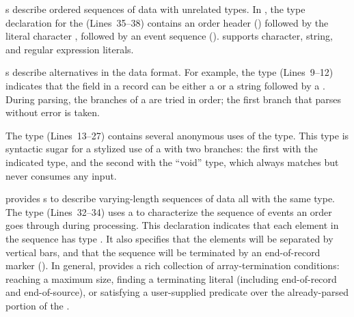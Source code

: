 
s describe ordered sequences of data with unrelated types.
In , the type declaration for the 
 (Lines~35--38)
contains an order header
() followed by the literal character ,
followed by an event sequence ().  \pads{} supports
character, string, and regular expression literals.

s describe alternatives in the data format.  For example,
the  type (Lines~9--12) indicates
that the  field in a \dibbler{} record can be either a
 or a string  followed by a .
During parsing, the branches of a  are tried in order; the
first branch that parses without error is taken.  

The  type (Lines~13--27) contains several anonymous uses of the
 type.  This type is syntactic sugar for a stylized use of a
 with two branches: the first with the indicated type, and
the second with the ``void'' type, which always matches but never
consumes any input.

\pads{} provides s to describe varying-length sequences of
data all with the same type.  The  type (Lines~32--34) uses a
 to characterize the sequence of events an order goes
through during processing.  This declaration indicates that each
element in the sequence has type .  It also specifies
that the elements will be separated by vertical bars, and that the
sequence will be terminated by an end-of-record marker ().
In general, \pads{} provides a rich collection of array-termination
conditions: reaching a maximum size, finding a terminating literal
(including end-of-record and end-of-source), or satisfying a
user-supplied predicate over the already-parsed portion of the
.

